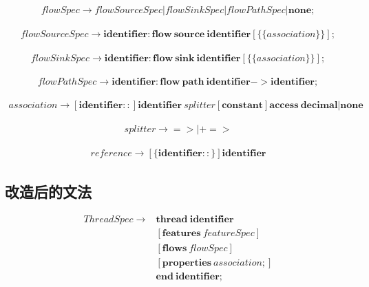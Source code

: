 \documentclass[UTF8]{ctexart}
\begin{document}
\begin{equation*} 
\begin{split}
flowSpec \rightarrow flowSourceSpec| flowSinkSpec| flowPathSpec| \bm{none;}
\end{split}
\end{equation*}

\begin{equation*} 
\begin{split}
flowSourceSpec \rightarrow \bm{identifier : flow \  source \ identifier}[ \bm{\{} \{ association \} \bm{\}} ] \bm{;}
\end{split}
\end{equation*}


\begin{equation*} 
\begin{split}
flowSinkSpec \rightarrow \bm{identifier:flow \ sink \ identifier} [ \bm{\{} \{ association \} \bm{\}} ] \bm{;}
\end{split}
\end{equation*}


\begin{equation*} 
\begin{split}
flowPathSpec \rightarrow \bm{identifier : flow \ path \ identifier -> identifier;}
\end{split}
\end{equation*}

\begin{equation*} 
\begin{split}
association \rightarrow [ \bm{identifier ::} ] \bm{identifier} \ splitter [ \bm{constant} ] \bm{access \ decimal} | \bm{none}
\end{split}
\end{equation*}

\begin{equation*} 
\begin{split}
splitter \rightarrow  \bm{=>} | \bm{+=>} 
\end{split}
\end{equation*}

\begin{equation*} 
\begin{split}
reference \rightarrow [  \bm{\{ identifier :: \}} ]  \bm{identifier}
\end{split}
\end{equation*}

\subsection{改造后的文法}
\begin{equation*} 
\begin{split}
ThreadSpec \rightarrow & \bm{thread \  identifier} \\
& [ \bm{features}  \ featureSpec ] \\
& [ \bm{flows} \  flowSpec ] \\
& [ \bm{properties} \ association\bm{;} ] \\
& \bm{end \ identifier ;}
\end{split}
\end{equation*}
\end{document}
